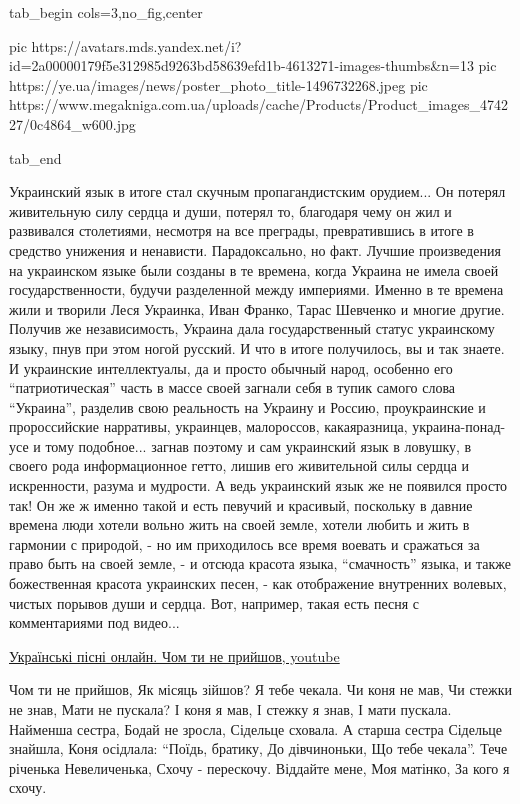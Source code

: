 \ifcmt
  tab_begin cols=3,no_fig,center

     pic https://avatars.mds.yandex.net/i?id=2a00000179f5e312985d9263bd58639efd1b-4613271-images-thumbs&n=13
		 pic https://ye.ua/images/news/poster_photo_title-1496732268.jpeg
		 pic https://www.megakniga.com.ua/uploads/cache/Products/Product_images_474227/0c4864_w600.jpg

  tab_end
\fi

Украинский язык в итоге стал скучным пропагандистским орудием... Он потерял
живительную силу сердца и души, потерял то, благодаря чему он жил и развивался
столетиями, несмотря на все преграды, превратившись в итоге в средство унижения
и ненависти. Парадоксально, но факт. Лучшие произведения на украинском языке
были созданы в те времена, когда Украина не имела своей государственности,
будучи разделенной между империями. Именно в те времена жили и творили Леся
Украинка, Иван Франко, Тарас Шевченко и многие другие. Получив же
независимость, Украина дала государственный статус украинскому языку, пнув при
этом ногой русский. И что в итоге получилось, вы и так знаете. И украинские
интеллектуалы, да и просто обычный народ, особенно его \enquote{патриотическая}
часть в массе своей загнали себя в тупик самого слова \enquote{Украина},
разделив свою реальность на Украину и Россию, проукраинские и пророссийские
нарративы, украинцев, малороссов, какаяразница, украина-понад-усе и тому
подобное... загнав поэтому и сам украинский язык в ловушку, в своего рода
информационное гетто, лишив его живительной силы сердца и искренности, разума и
мудрости. А ведь украинский язык же не появился просто так! Он же ж именно
такой и есть певучий и красивый, поскольку в давние времена люди хотели вольно
жить на своей земле, хотели любить и жить в гармонии с природой, - но им
приходилось все время воевать и сражаться за право быть на своей земле, - и
отсюда красота языка, \enquote{смачность} языка,  и также божественная красота
украинских песен, - как отображение внутренних волевых, чистых порывов души и
сердца. Вот, например, такая есть песня с комментариями под видео... 

\href{https://www.youtube.com/watch?v=--iWRp8Jr6k}{%
Українські пісні онлайн. Чом ти не прийшов, youtube}

\raggedcolumns
\begin{multicols}{4} %
\setlength{\parindent}{0pt}
\obeycr
Чом ти не прийшов,
Як місяць зійшов?
Я тебе чекала.
Чи коня не мав,
Чи стежки не знав,
Мати не пускала?
\smallskip
І коня я мав,
І стежку я знав,
І мати пускала.
Найменша сестра,
Бодай не зросла,
Сідельце сховала.
\smallskip
А старша сестра
Сідельце знайшла,
Коня осідлала:
\enquote{Поїдь, братику,
До дівчиноньки,
Що тебе чекала}.
\smallskip
Тече річенька
Невеличенька,
Схочу - перескочу.
Віддайте мене,
Моя матінко,
За кого я схочу.
\restorecr
\end{multicols} %

